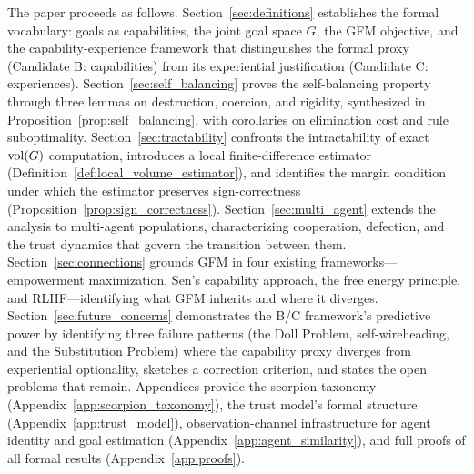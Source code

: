 The paper proceeds as follows. Section~\ref{sec:definitions} establishes the
formal vocabulary: goals as capabilities, the joint goal space $G$, the GFM
objective, and the capability-experience framework that distinguishes the
formal proxy (Candidate B: capabilities) from its experiential justification
(Candidate C: experiences). Section~\ref{sec:self_balancing} proves the
self-balancing property through three lemmas on destruction, coercion, and
rigidity, synthesized in Proposition~\ref{prop:self_balancing}, with
corollaries on elimination cost and rule suboptimality.
Section~\ref{sec:tractability} confronts the intractability of exact $\operatorname{vol}(G)$
computation, introduces a local finite-difference estimator
(Definition~\ref{def:local_volume_estimator}), and identifies the margin
condition under which the estimator preserves sign-correctness
(Proposition~\ref{prop:sign_correctness}). Section~\ref{sec:multi_agent}
extends the analysis to multi-agent populations, characterizing cooperation,
defection, and the trust dynamics that govern the transition between them.
Section~\ref{sec:connections} grounds GFM in four existing
frameworks---empowerment maximization, Sen's capability approach, the free
energy principle, and RLHF---identifying what GFM inherits and where it
diverges. Section~\ref{sec:future_concerns} demonstrates the B/C framework's
predictive power by identifying three failure patterns (the Doll Problem,
self-wireheading, and the Substitution Problem) where the capability proxy
diverges from experiential optionality, sketches a correction criterion, and
states the open problems that remain. Appendices provide the scorpion taxonomy
(Appendix~\ref{app:scorpion_taxonomy}), the trust model's formal structure
(Appendix~\ref{app:trust_model}), observation-channel infrastructure for agent
identity and goal estimation (Appendix~\ref{app:agent_similarity}), and full
proofs of all formal results (Appendix~\ref{app:proofs}).
